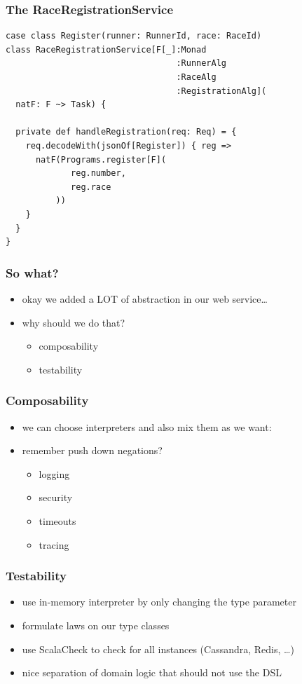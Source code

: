 \documentclass{beamer}
\begin{document}
\begin{frame}[fragile]
  \addtocounter{framenumber}{-1}
  \frametitle{The RaceRegistrationService}
\begin{verbatim}
case class Register(runner: RunnerId, race: RaceId)
class RaceRegistrationService[F[_]:Monad
                                  :RunnerAlg
                                  :RaceAlg
                                  :RegistrationAlg](
  natF: F ~> Task) {

  private def handleRegistration(req: Req) = {
    req.decodeWith(jsonOf[Register]) { reg =>
      natF(Programs.register[F](
             reg.number,
             reg.race
          ))
    }
  }
}
\end{verbatim}
\end{frame}

\begin{frame}
  \frametitle{So what?}
  \begin{itemize}
  \item okay we added a LOT of abstraction in our web service\ldots
  \item why should we do that?
    \begin{itemize}
    \item composability
    \item testability
    \end{itemize}
  \end{itemize}
\end{frame}

\begin{frame}
  \frametitle{Composability}
  \begin{itemize}
  \item we can choose interpreters and also mix them as we want:
  \item remember push down negations?
    \begin{itemize}
    \item logging
    \item security
    \item timeouts
    \item tracing
    \end{itemize}
  \end{itemize}
\end{frame}

\begin{frame}
  \frametitle{Testability}
  \begin{itemize}
  \item use in-memory interpreter by only changing the type parameter
  \item formulate laws on our type classes
  \item use ScalaCheck to check for all instances (Cassandra, Redis,
    \ldots)
  \item nice separation of domain logic that should not use the DSL
  \end{itemize}
\end{frame}
\end{document}
